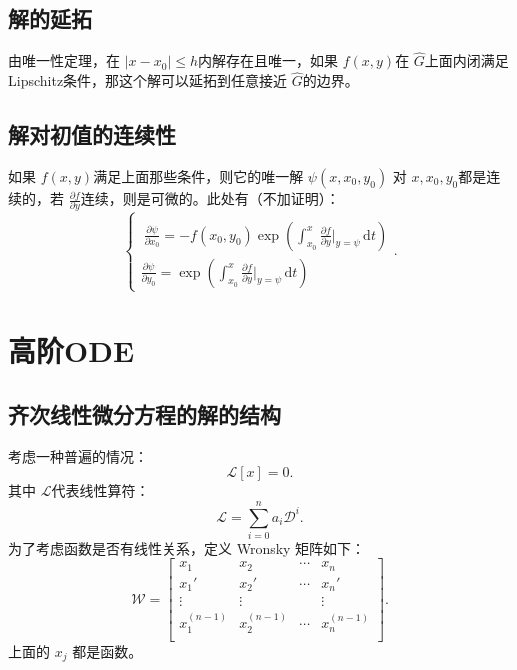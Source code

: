 \documentclass{ctexart}
\begin{document}
\subsection{解的延拓}
由唯一性定理，在 \(\left\vert x-x_0 \right\vert \leqslant h\)内解存在且唯一，如果 \(f(x,y)\)在 \(\hat{G}\)上面内闭满足Lipschitz条件，那这个解可以延拓到任意接近 \(\hat{G}\)的边界。
\subsection{解对初值的连续性}如果 \(f(x,y)\)满足上面那些条件，则它的唯一解 \(\psi (x,x_0,y_0)\) 对 \(x,x_0,y_0\)都是连续的，若 \(\frac{\partial f}{\partial y} \)连续，则是可微的。此处有（不加证明）：
\[
	\begin{cases}
		\\[-2.2em]\
		\frac{\partial \psi}{\partial x_0}=-f(x_0,y_0)\exp \left( \int_{x_0}^x \frac{\partial f}{\partial y}\Bigg|_{y=\psi } \,\mathrm{d}t  \right) \\
		\frac{\partial \psi}{\partial y_0}=\exp \left( \int_{x_0}^x \frac{\partial f}{\partial y}\Bigg|_{y=\psi } \,\mathrm{d}t  \right)
	\end{cases}
	.\]
\section{高阶ODE}
\subsection{齐次线性微分方程的解的结构}
考虑一种普遍的情况：
\[
	\mathcal{L} [x]=0\tag{HOM}
	.\]
其中 \(\mathcal{L} \)代表线性算符：
\[
	\mathcal{L} = \sum\limits_{i=0}^{n} a_i\mathcal{D} ^i
	.\]
为了考虑函数是否有线性关系，定义 Wronsky 矩阵如下：
\[
	\mathcal{W} =\begin{bmatrix}
		x_1         & x_2         & \cdots & x_n         \\
		x_1'        & x_2'        & \cdots & x_n'        \\
		\vdots      & \vdots      &        & \vdots      \\
		x_1^{(n-1)} & x_2^{(n-1)} & \cdots & x_n^{(n-1)} \\
	\end{bmatrix}
	.\]
上面的 \(x_j\) 都是函数。
\end{document}
